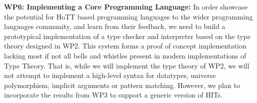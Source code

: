 \documentclass[a4paper,11pt]{article}
\begin{document}
  





{\bf WP6: Implementing a Core Programming Language:} In order showcase
the potential for HoTT based programming languages to the wider
programming languages community, and learn from their feedback, we
need to build a prototypical implementation of a type checker and
interpreter based on the type theory designed in WP2.  This system
forms a proof of concept implementation lacking most if not all bells
and whistles present in modern implementations of Type Theory. That
is, while we will implement the type theory of WP2, we will not
attempt to implement a high-level syntax for datatypes, universe
polymorphism, implicit arguments or pattern matching. However, we plan
to incorporate the results from WP3 to support a generic version of
HITs.
\end{document}
